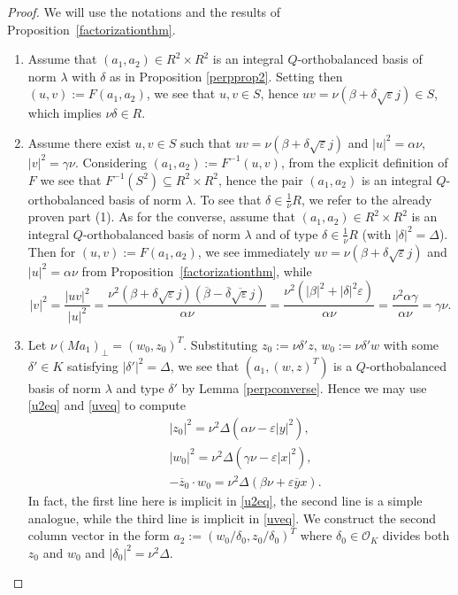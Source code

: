 \documentclass[11pt]{amsart}
\theoremstyle{definition}
\theoremstyle{remark}
\begin{document}
\begin{proof} We will use the notations and the results of Proposition~\ref{factorizationthm}.
\begin{enumerate}
\item Assume that $(a_1,a_2)\in R^2\times R^2$ is an integral $Q$-orthobalanced basis of norm $\lambda$ with $\delta$ as in Proposition \ref{perpprop2}. Setting then $(u,v):=F(a_1,a_2)$, we see that $u,v\in S$,
hence $uv=\nu(\beta+\delta\sqrt{\varepsilon}j)\in S$, which implies $\nu\delta\in R$.
\item Assume there exist $u,v\in S$ such that $uv=\nu(\beta+\delta\sqrt{\varepsilon}j)$ and $|u|^2=\alpha\nu$, $|v|^2=\gamma\nu$. Considering $(a_1,a_2):=F^{-1}(u,v)$, from the explicit definition of $F$ we see that $F^{-1}(S^2)\subseteq R^2\times R^2$, hence the pair $(a_1,a_2)$ is an integral $Q$-orthobalanced basis of norm $\lambda$. To see that $\delta\in\frac{1}{\nu}R$, we refer to the already proven part (1). As for the converse, assume that $(a_1,a_2)\in R^2\times R^2$ is an integral $Q$-orthobalanced basis of norm $\lambda$ and of type $\delta\in\frac{1}{\nu} R$ (with $|\delta|^2=\Delta$). Then for $(u,v):=F(a_1,a_2)$, we see immediately $uv=\nu(\beta+\delta\sqrt{\varepsilon}j)$ and $|u|^2=\alpha\nu$ from Proposition~\ref{factorizationthm}, while
\[
|v|^2=\frac{|uv|^2}{|u|^2}=\frac{\nu^2(\beta+\delta\sqrt{\varepsilon}j)(\overline{\beta}-\overline{\delta}\overline{\sqrt{\varepsilon}}j)}{\alpha\nu}=\frac{\nu^2(|\beta|^2+|\delta|^2\varepsilon)}{\alpha\nu}=\frac{\nu^2\alpha\gamma}{\alpha\nu}=\gamma\nu.
\]

\item Let $\nu(Ma_1)_\perp=(w_0,z_0)^T$.
Substituting $z_0:=\nu\delta'z$, $w_0:=\nu\delta'w$
with some $\delta'\in K$ satisfying $|\delta'|^2=\Delta$, we see that $(a_1,(w,z)^T)$ is a $Q$-orthobalanced basis of norm $\lambda$ and type $\delta'$ by Lemma \ref{perpconverse}. Hence we may use \eqref{u2eq} and \eqref{uveq} to compute
\begin{equation*}\label{eq:z0w0}
\begin{split}
&|z_0|^2=\nu^2\Delta(\alpha\nu-\varepsilon|y|^2) 
,\\
&|w_0|^2=\nu^2\Delta(\gamma\nu-\varepsilon|x|^2) 
,\\
&-\overline z_0\cdot w_0=\nu^2\Delta(\beta\nu+\varepsilon\overline yx)
.
\end{split}
\end{equation*}
In fact, the first line here is implicit in \eqref{u2eq}, the second line is a simple analogue, while the third line is implicit in \eqref{uveq}. We construct the second column vector in the form $a_2:=(w_0/\delta_0,z_0/\delta_0)^T$ where $\delta_0\in \mathcal{O}_K$ divides both $z_0$ and $w_0$ and $|\delta_0|^2=\nu^2\Delta$.



\end{enumerate}
\end{proof}
\end{document}
